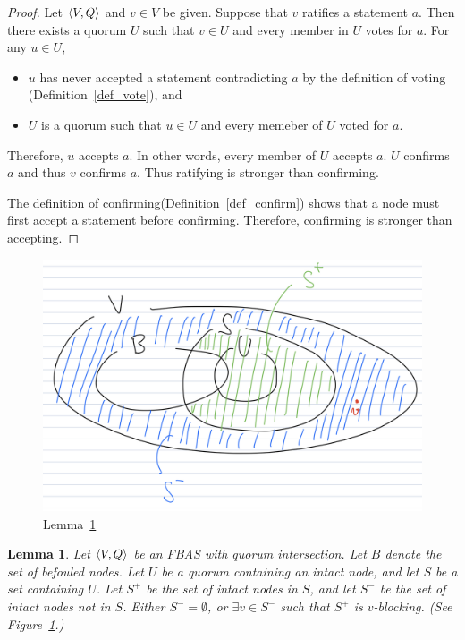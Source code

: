 \documentclass[12pt, psamsfonts]{amsart}
\newtheorem{lem}[thm]{Lemma}
\theoremstyle{definition}
\theoremstyle{remark}
\numberwithin{equation}{subsection}
\begin{document}
\begin{proof}
    Let $\ev{V, Q}$ and $v \in V$ be given.
    Suppose that $v$ ratifies a statement $a$.
    Then there exists a quorum $U$ such that $v \in U$ and every member in $U$ votes for $a$.
    For any $u \in U$,
    \begin{itemize}
        \item
            $u$ has never accepted a statement contradicting $a$ by the definition of voting (Definition~\ref{def_vote}), and
        \item
            $U$ is a quorum such that $u \in U$ and every memeber of $U$ voted for $a$.
    \end{itemize}
    Therefore, $u$ accepts $a$.
    In other words, every member of $U$ accepts $a$.
    $U$ confirms $a$ and thus $v$ confirms $a$.
    Thus ratifying is stronger than confirming.

    The definition of confirming(Definition~\ref{def_confirm}) shows that a node must first accept a statement before confirming.
    Therefore, confirming is stronger than accepting.
\end{proof}

\begin{figure}[!htb]
    \includegraphics[width=.5\linewidth]{img/lemma_for_every_intact_node.jpeg}
    \caption{Lemma~\ref{lemma_for_every_intact_node}}
    \label{fig:lemma_for_every_intact_node}
\end{figure}

\begin{lem}\label{lemma_for_every_intact_node}
    Let $\ev{V, Q}$ be an FBAS with quorum intersection.
    Let $B$ denote the set of befouled nodes.
    Let $U$ be a quorum containing an intact node, and let $S$ be a set containing $U$.
    Let $S^{+}$ be the set of intact nodes in $S$, and let $S^{-}$ be the set of intact nodes not in $S$.
    Either $S^{-} = \emptyset$, or $\exists v \in S^{-}$ such that $S^{+}$ is $v$-blocking.
    (See Figure~\ref{fig:lemma_for_every_intact_node}.)
\end{lem}
\end{document}
